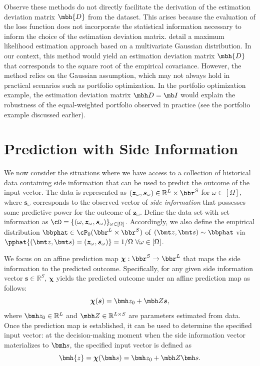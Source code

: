 \documentclass[opre, blindrev]{informs4}
\newcommand{\1}[1]{\mathds{1}{\left(#1\right)}}
\begin{document}
Observe these methods do not directly facilitate the derivation of the estimation deviation matrix $\mbh{D}$ from the dataset. This arises because the evaluation of the loss function does not incorporate the statistical information necessary to inform the choice of the estimation deviation matrix. \cite{Zhu_Xie_Sim_2021joint} detail a maximum likelihood estimation approach based on a multivariate Gaussian distribution. In our context, this method would yield an estimation deviation matrix $\mbh{D}$ that corresponds to the square root of the empirical covariance. However, the method relies on the Gaussian assumption, which may not always hold in practical scenarios such as portfolio optimization. In the portfolio optimization example, the estimation deviation matrix $\mbh D = \mb I$ would explain the robustness of the equal-weighted portfolio observed in practice (see the portfolio example discussed earlier).

\section{Prediction with Side Information}
\label{sec:prediction_with_side_info}

We now consider the situations where we have access to a collection of historical data containing side information that can be used to predict the outcome of the input vector. The data is represented as $(\bm{z}_\omega, \bm s_\omega) \in \mathbb{R}^L \times \bbr^S$ for $\omega \in [\Omega]$, where $\bm{s}_\omega$ corresponds to the observed vector of \textit{side information} that possesses some predictive power for the outcome of $\bm z_\omega$. Define the data set with set information as $\cD = \{(\omega,\bm z_\omega,\bm s_\omega)\}_{\omega  \in [\Omega]}$. Accordingly, we also define the empirical distribution $\bbphat \in \cP_0(\bbr^L\times \bbr^S )$ of $(\bmt z,\bmt s) \sim \bbphat$ via $\pphat{(\bmt z,\bmt s) = (\bm z_\omega,\bm s_\omega) } = 1/\Omega ~\forall \omega  \in [\Omega]$. 

We focus on an affine prediction map $\bm \chi:\bbr^S\rightarrow \bbr^L$ that maps the side information to the predicted outcome. Specifically, for any given side information vector $\bm s \in \mathbb{R}^S$, $\bm \chi$ yields the predicted outcome under an affine prediction map as follows:
$$
\bm \chi(\bm s) = \bmh z_0 + \mbh Z \bm s,
$$ 
where $\bmh z_0 \in \mathbb{R}^{L}$ and $\mbh Z \in \mathbb{R}^{L\times S}$ are parameters estimated from data. Once the prediction map is established, it can be used to determine the specified input vector: at the decision-making moment when the side information vector materializes to $\bmh s$, the specified input vector is defined as 
$$
\bmh{z} = \bm \chi(\bmh s) = \bmh z_0 + \mbh Z \bmh s.
$$
\end{document}
